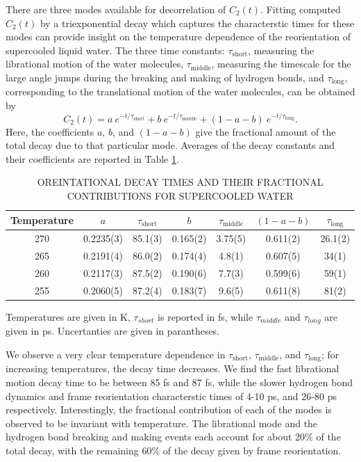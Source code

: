 There are three modes available for decorrelation of $C_2(t)$. Fitting
computed $C_2(t)$ by a triexponential decay which captures the
characterstic times for these modes can provide insight on the
temperature dependence of the reorientation of supercooled liquid
water. The three time constants: $\tau_\mathrm{short}$, measuring the
librational motion of the water molecules, $\tau_\mathrm{middle}$,
measuring the timescale for the large angle jumps during the breaking
and making of hydrogen bonds, and $\tau_\mathrm{long}$, corresponding
to the translational motion of the water molecules, can be obtained
by\cite{Louden2013a}
\begin{equation}
  C_{2}(t) = a~e^{-t/\tau_\mathrm{short}} + b~e^{-t/\tau_\mathrm{middle}} + 
  (1-a-b)~e^{-t/\tau_\mathrm{long}}.
\label{eq:c2}
\end{equation}
Here, the coefficients $a$, $b$, and $(1-a-b)$ give the fractional
amount of the total decay due to that particular mode. Averages of the
decay constants and their coefficients are reported in Table
\ref{tab:supOrient}.


\begin{table}[h] \centering \caption{OREINTATIONAL DECAY TIMES AND
    THEIR FRACTIONAL CONTRIBUTIONS FOR SUPERCOOLED WATER\label{tab:supOrient}}
\begin{tabular}{ccccccc}
\hline
\hline
 Temperature & $a$ & $\tau_\mathrm{short}$& $b$ &
                                                  $\tau_\mathrm{middle}$
  & $(1-a-b)$ & $\tau_\mathrm{long}$\\
\hline
270 &0.2235(3) &85.1(3) & 0.165(2) & 3.75(5) & 0.611(2) & 26.1(2)\\
265 &0.2191(4) &86.0(2) & 0.174(4) & 4.8(1) & 0.607(5) & 34(1)\\
260 &0.2117(3) &87.5(2) & 0.190(6) & 7.7(3) & 0.599(6) & 59(1)\\
255 &0.2060(5) &87.2(4) & 0.183(7) & 9.6(5) & 0.611(8) & 81(2)\\
\hline
\hline
\end{tabular}
\begin{flushleft}
Temperatures are given in K, $\tau_{short}$ is reported in fs, while $\tau_{middle}$ and
$\tau_{long}$ are given in ps. Uncertanties are given in parantheses.
\end{flushleft}
\end{table}

We observe a very clear temperature dependence in
$\tau_\mathrm{short}$, $\tau_\mathrm{middle}$, and
$\tau_\mathrm{long}$; for increasing temperatures, the decay time
decreases. We find the fast librational motion decay time to be
between 85 fs and 87 fs, while the slower hydrogen bond dynamics and
frame reorientation characterstic times of 4-10 ps, and 26-80 ps
respectively.  Interestingly, the fractional contribution of each of
the modes is observed to be invariant with temperature. The
librational mode and the hydrogen bond breaking and making events each
account for about 20$\%$ of the total decay, with the remaining 60$\%$
of the decay given by frame reorientation.


